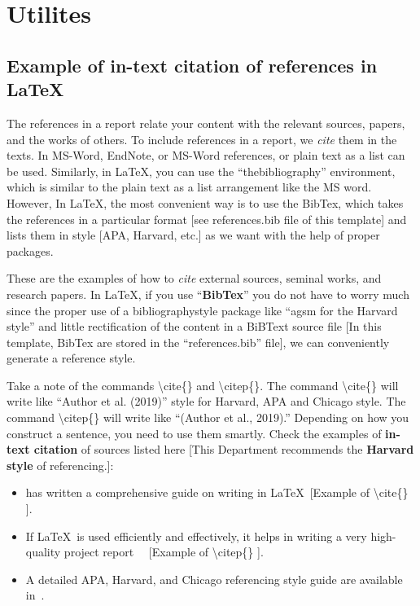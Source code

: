 \chapter*{Utilites}


\section*{Example of in-text citation of references in \LaTeX} 
The references in a report relate your content with the relevant sources, papers, and the works of others. To include references in a report, we \textit{cite} them in the texts. In MS-Word, EndNote, or MS-Word references, or plain text as a list can be used. Similarly, in \LaTeX, you can use the ``thebibliography'' environment, which is similar to the plain text as a list arrangement like the MS word. However, In \LaTeX, the most convenient way is to use the BibTex, which takes the references in a particular format [see references.bib file of this template] and lists them in style [APA, Harvard, etc.] as we want with the help of proper packages.    

These are the examples of how to \textit{cite} external sources, seminal works, and research papers. In \LaTeX, if you use ``\textbf{BibTex}'' you do not have to worry much since the proper use of a bibliographystyle package like ``agsm for the Harvard style'' and little rectification of the content in a BiBText source file [In this template, BibTex are stored in the ``references.bib'' file], we can conveniently generate  a reference style. 

Take a note of the commands \textbackslash cite\{\} and \textbackslash citep\{\}. The command \textbackslash cite\{\} will write like ``Author et al. (2019)'' style for Harvard, APA and Chicago style. The command \textbackslash citep\{\} will write like ``(Author et al., 2019).'' Depending on how you construct a sentence, you need to use them smartly. Check the examples of \textbf{in-text citation} of sources listed here [This Department recommends the \textbf{Harvard style} of referencing.]:
\begin{itemize}
    \item \cite{kottwitzlatex2021} has written a comprehensive guide on writing in \LaTeX ~[Example of \textbackslash cite\{\} ].
    \item If \LaTeX~is used efficiently and effectively, it helps in writing a very high-quality project report~\citep{lamport1994latex} ~[Example of \textbackslash citep\{\} ].   
    \item A detailed APA, Harvard, and Chicago referencing style guide are available in~\citep{uor_refernce_style}.
\end{itemize}


